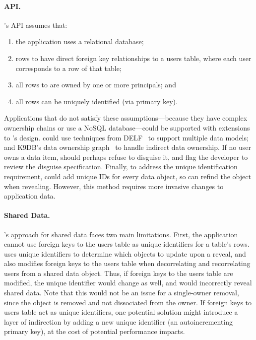\paragraph{API.}
\sys's API assumes that:
\begin{enumerate}[nosep]
    \item the application uses a relational database;
    \item rows to \xx have direct foreign key relationships to a users table,
    where each user corresponds to a row of that table;
    \item all rows to \xx are owned by one or more principals; and
    \item all rows can be uniquely identified (\eg via primary key).
\end{enumerate}
%
Applications that do not satisfy these assumptions---\eg because they have
complex ownership chains or use a NoSQL database---could be supported with
extensions to \sys's design. \sys could use techniques from DELF~\cite{delf} to
support multiple data models; 
%
and K9DB's data ownership graph~\cite{k9db} to handle indirect data ownership.
If no user owns a data item, \sys should perhaps refuse to disguise it, and flag
the developer to review the disguise specification.  
%
Finally, to address the unique identification requirement, \sys could add unique
IDs for every data object, so \sys can refind the object when revealing.
However, this method requires more invasive changes to application data. 
%

\paragraph{Shared Data.}
\sys's approach for shared data faces two main limitations. First, the
application cannot use foreign keys to the users table as unique identifiers for
a table's rows. \sys uses unique identifiers to determine which objects to
update upon a reveal, and also modifies foreign keys to the users table when
decorrelating and recorrelating users from a shared data object. Thus, if
foreign keys to the users table are modified, the unique identifier would change
as well, and \sys would incorrectly reveal shared data.
%
Note that this would not be an issue for a single-owner removal, since the
object is removed and not dissociated from the owner.
%
If foreign keys to users table act as unique identifiers, one potential solution
might introduce a layer of indirection by adding a new unique identifier (\eg an
autoincrementing primary key), at the cost of potential performance impacts.

